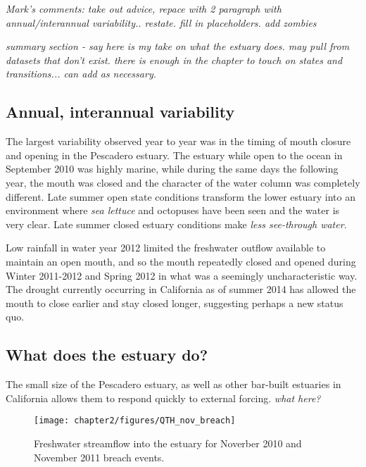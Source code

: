 \emph{Mark's comments: take out advice, repace with 2 paragraph with annual/interannual variability.. restate. fill in placeholders. add zombies}

\emph{summary section - say here is my take on what the estuary does.  may pull from datasets that don't exist.  there is enough in the chapter to touch on states and transitions... can add as necessary.}

\subsection{Annual, interannual variability}


The largest variability observed year to year was in the timing of mouth closure and opening in the Pescadero estuary. The estuary while open to the ocean in September 2010 was highly marine, while during the same days the following year, the mouth was closed and the character of the water column was completely different. Late summer open state conditions transform the lower estuary into an environment where \emph{sea lettuce} and octopuses have been seen and the water is very clear. Late summer closed estuary conditions make \emph{less see-through water}. 

Low rainfall in water year 2012 limited the freshwater outflow available to maintain an open mouth, and so the mouth repeatedly closed and opened during Winter 2011-2012 and Spring 2012 in what was a seemingly uncharacteristic way. The drought currently occurring in California as of summer 2014 has allowed the mouth to close earlier and stay closed longer, suggesting perhaps a new status quo. 

\subsection{What does the estuary do?}

The small size of the Pescadero estuary, as well as other bar-built estuaries in California allows them to respond quickly to external forcing. \emph{what here?}








\begin{figure}
		\texttt{[image: chapter2/figures/QTH\_nov\_breach]}
\caption{Freshwater streamflow into the estuary for Noverber 2010 and November 2011 breach events.} \label{fig:QbreachNov}
\end{figure}


